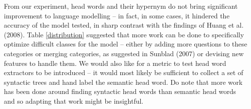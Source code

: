 \documentclass[11pt]{article}
\begin{document}
From our experiment, head words and their hypernym do not bring significant improvement to language modelling -- in fact, in some cases, it hindered the accuracy of the model tested, in sharp contrast with the findings of Huang et al. (2008). Table \ref{distribution} suggested that more work can be done to specifically optimize difficult classes for the model -- either by adding more questions to these categories or merging categories, as suggested in Sunblad (2007) or devising new features to handle them. We would also like for a metric to test head word extractors to be introduced -- it would most likely be sufficient to collect a set of syntactic trees and hand label the semantic head word. Do note that more work has been done around finding syntactic head words \cite{collins} than semantic head words and so adapting that work might be insightful.



\end{document}
